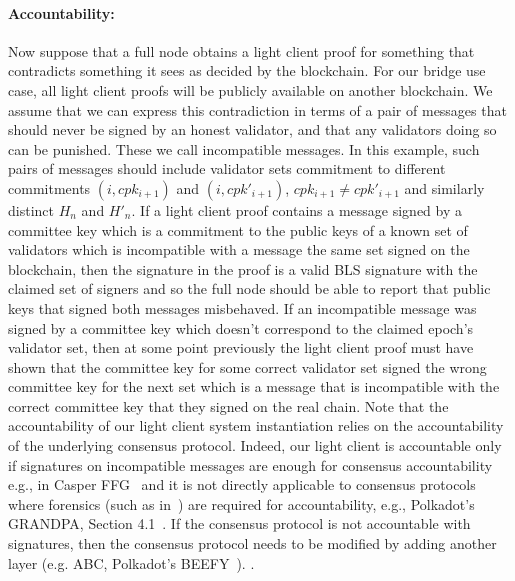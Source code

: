 \noindent\paragraph{Accountability:} Now suppose that a full node obtains a light client proof for something that contradicts something it sees as decided
by the blockchain. For our bridge use case, all light client proofs will be publicly available on another blockchain. We assume that we can express this
contradiction in terms of a pair of messages that should never be signed by an honest validator, and that any validators doing so can be punished.
These we call incompatible messages. In this example, such pairs of messages should include validator sets commitment to different
commitments $(i,cpk_{i+1})$ and $(i,cpk'_{i+1})$, $cpk_{i+1} \neq cpk'_{i+1}$ and similarly distinct $H_n$ and $H'_n$. If a light client proof
contains a message signed by a committee key which is a commitment to the public keys of a known set of validators which is incompatible with a
message the same set signed on the blockchain, then the signature in the proof is a valid BLS signature with the claimed set of signers and so the full
node should be able to report that public keys that signed both messages misbehaved. If an incompatible message was signed by a committee key
which doesn't correspond to the claimed epoch's validator set, then at some point previously the light client proof must have shown that the committee
key for some correct validator set signed the wrong committee key for the next set which is a message that is incompatible with the correct committee
key that they signed on the real chain. Note that the accountability of our light client system instantiation relies on the accountability of the
underlying consensus protocol. Indeed, our light client is accountable only if signatures on incompatible messages are enough for consensus
accountability e.g., in Casper FFG~\cite{CasperFFG} and it is not directly applicable to consensus protocols where forensics (such as in~\cite{forensics})
are required for accountability, e.g., Polkadot's GRANDPA, Section 4.1~\cite{GRANDPA}. If the consensus protocol is not accountable with signatures,
then the consensus protocol needs to be modified by adding another layer (e.g. ABC\cite{ABC}, Polkadot's BEEFY~\cite{BEEFY}).
\vspace{-0.05in}.

